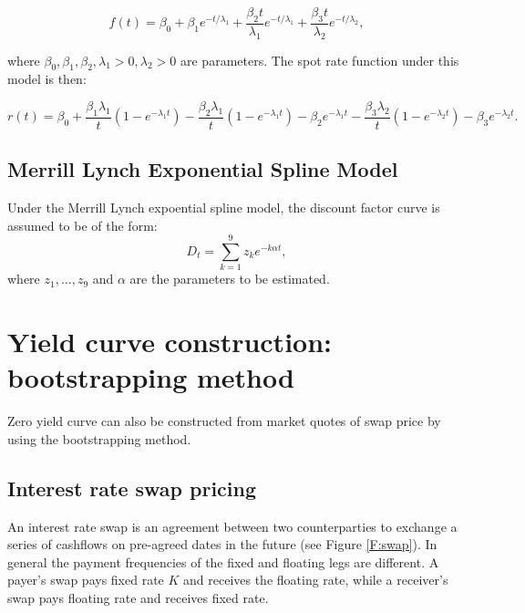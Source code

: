 \begin{equation}
  f(t) = \beta_0 + \beta_1 e^{-t/\lambda_1} 
         + \frac{\beta_2 t}{\lambda_1} e^{-t/\lambda_1}
         + \frac{\beta_3 t}{\lambda_2} e^{-t/\lambda_2},
\end{equation}

where $\beta_0,\beta_1,\beta_2,\lambda_1>0, \lambda_2>0$ are parameters. The 
spot rate function under this model is then:

\begin{equation}
  r(t) = \beta_0 + \frac{\beta_1 \lambda_1}{t} \left(1- e^{-\lambda_1 t} \right)
         - \frac{\beta_2 \lambda_1}{t} \left(1- e^{-\lambda_1 t} \right)
         - \beta_2 e^{-\lambda_1 t}
         - \frac{\beta_3 \lambda_2}{t} \left(1- e^{-\lambda_2 t} \right)
         - \beta_3 e^{-\lambda_2 t}.
\end{equation}

\subsection{Merrill Lynch Exponential Spline Model}

Under the Merrill Lynch expoential spline model, the discount factor curve is
assumed to be of the form:
\begin{equation}
  D_t = \sum_{k=1}^9 z_k e^{-k\alpha t },
\end{equation}
where $z_1,\dots,z_9$ and $\alpha$ are the parameters to be estimated.



\section{Yield curve construction: bootstrapping method}
Zero yield curve can also be constructed from market quotes of swap price by
using the bootstrapping method.

\subsection{Interest rate swap pricing}

An interest rate swap is an agreement between two counterparties
to exchange a series of cashflows on pre-agreed dates in the future (see Figure
\ref{F:swap}). In general the payment frequencies of the fixed and floating legs
are different. A payer's swap pays fixed rate $K$ and receives the floating rate, 
while a receiver's swap pays floating rate and receives fixed rate.


